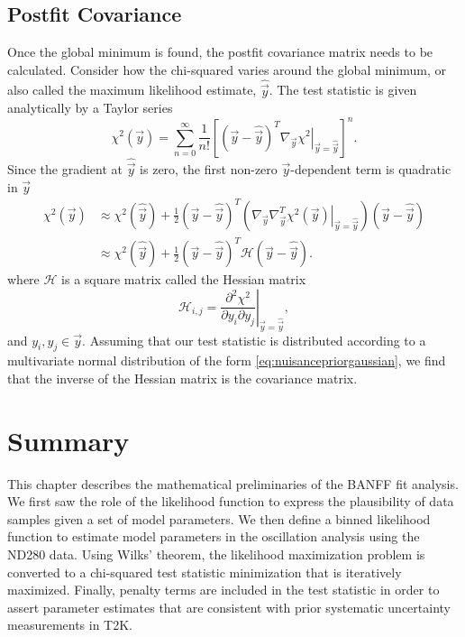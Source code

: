 \subsection{Postfit Covariance}

Once the global minimum is found, the postfit covariance matrix needs
to be calculated. Consider how the chi-squared varies around the global
minimum, or also called the maximum likelihood estimate, $\hat{\vec{y}}$.
The test statistic is given analytically by a Taylor series
\[
\chi^{2}\left(\vec{y}\right)=\sum_{n=0}^{\infty}\frac{1}{n!}\left[\left(\vec{y}-\hat{\vec{y}}\right)^{T}\left.\nabla_{\vec{y}}\chi^{2}\right|_{\vec{y}=\hat{\vec{y}}}\right]^{n}.
\]
Since the gradient at $\hat{\vec{y}}$ is zero, the first non-zero
$\vec{y}$-dependent term is quadratic in $\vec{y}$
\[
\begin{aligned}\chi^{2}\left(\vec{y}\right) & \approx\chi^{2}\left(\hat{\vec{y}}\right)+\frac{1}{2}\left(\vec{y}-\hat{\vec{y}}\right)^{T}\left(\left.\nabla_{\vec{y}}\nabla_{\vec{y}}^{T}\chi^{2}\left(\vec{y}\right)\right|_{\vec{y}=\hat{\vec{y}}}\right)\left(\vec{y}-\hat{\vec{y}}\right)\\
 & \approx\chi^{2}\left(\hat{\vec{y}}\right)+\frac{1}{2}\left(\vec{y}-\hat{\vec{y}}\right)^{T}\mathcal{H}\left(\vec{y}-\hat{\vec{y}}\right).
\end{aligned}
\]
where $\mathcal{H}$ is a square matrix called the Hessian matrix
\begin{equation}
\mathcal{H}_{i,j}=\left.\frac{\partial^{2}\chi^{2}}{\partial y_{i}\partial y_{j}}\right|_{\vec{y}=\hat{\vec{y}}},\label{eq:HessianMatrix}
\end{equation}
and $y_{i},y_{j}\in\vec{y}$. Assuming that our test statistic is
distributed according to a multivariate normal distribution of the
form \eqref{eq:nuisancepriorgaussian}, we find that the inverse of
the Hessian matrix is the covariance matrix.

\section{Summary\label{sec:LikielihoodSummary}}

This chapter describes the mathematical preliminaries of the BANFF
fit analysis. We first saw the role of the likelihood function to
express the plausibility of data samples given a set of model parameters.
We then define a binned likelihood function to estimate model parameters
in the oscillation analysis using the ND280 data. Using Wilks' theorem,
the likelihood maximization problem is converted to a chi-squared
test statistic minimization that is iteratively maximized. Finally,
penalty terms are included in the test statistic in order to assert
parameter estimates that are consistent with prior systematic uncertainty
measurements in T2K.
